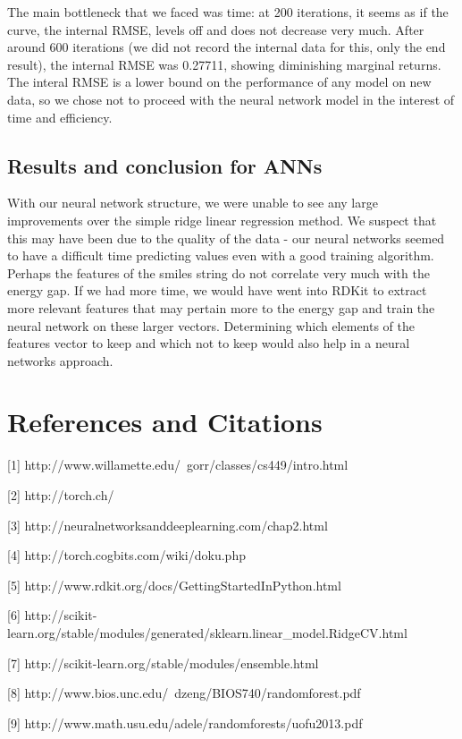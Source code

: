 \documentclass{article}
\begin{document}

The main bottleneck that we faced was time: at 200 iterations, it seems
as if the curve, the internal RMSE, levels off and does not
decrease very much.  After around 600 iterations (we did not
record the internal data for this, only the end result),
the internal RMSE was 0.27711, showing diminishing marginal
returns.  The interal RMSE is a lower
bound on the performance of any model on new data, so we chose
not to proceed with the neural network model in the interest
of time and efficiency.

\subsection{Results and conclusion for ANNs}
With our neural network structure, we were unable to see any large 
improvements over the simple ridge linear regression method.  
We suspect
 that this may have been due to the quality of the data 
 - our neural networks seemed to 
 have a difficult time predicting values even with a good training
 algorithm.  Perhaps the features of the smiles string do not correlate
 very much with the energy gap.  If we had more time, we would have
 went into RDKit to extract more relevant features that may pertain more
 to the energy gap and train the neural network on these larger
 vectors.  Determining which elements of the features vector
 to keep and which not to keep would also help in a neural networks approach.

\section{References and Citations}


\begin{description}
  \item{[1]} http://www.willamette.edu/~gorr/classes/cs449/intro.html
  \item{[2]} http://torch.ch/
  \item{[3]} http://neuralnetworksanddeeplearning.com/chap2.html
  \item{[4]} http://torch.cogbits.com/wiki/doku.php
  \item{[5]} http://www.rdkit.org/docs/GettingStartedInPython.html
  \item{[6]} http://scikit-learn.org/stable/modules/generated/sklearn.linear\_model.RidgeCV.html
  \item{[7]} http://scikit-learn.org/stable/modules/ensemble.html
   \item{[8]} http://www.bios.unc.edu/~dzeng/BIOS740/randomforest.pdf
    \item{[9]} http://www.math.usu.edu/adele/randomforests/uofu2013.pdf
\end{description}
\end{document}

